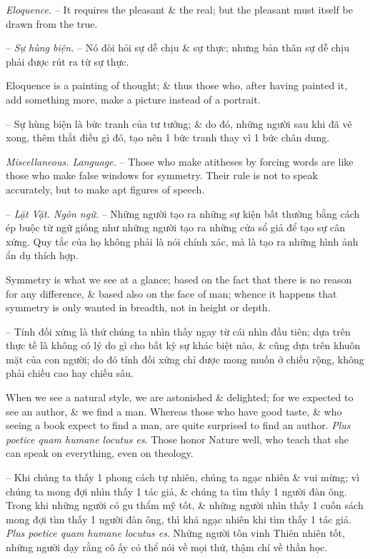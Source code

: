 \documentclass{article}
\begin{document}
\begin{enumerate}
\begin{itemize}
		 {\it Eloquence.} -- It requires the pleasant \& the real; but the pleasant must itself be drawn from the true.
		
		-- {\it Sự hùng biện.} -- Nó đòi hỏi sự dễ chịu \& sự thực; nhưng bản thân sự dễ chịu phải được rút ra từ sự thực.
		
		 Eloquence is a painting of thought; \& thus those who, after having painted it, add something more, make a picture instead of a portrait.
		
		-- Sự hùng biện là bức tranh của tư tưởng; \& do đó, những người sau khi đã vẽ xong, thêm thắt điều gì đó, tạo nên 1 bức tranh thay vì 1 bức chân dung.
		
		 {\it Miscellaneous. Language.} -- Those who make atitheses by forcing words are like those who make false windows for symmetry. Their rule is not to speak accurately, but to make apt figures of speech.
		
		-- {\it Lặt Vặt. Ngôn ngữ.} -- Những người tạo ra những sự kiện bất thường bằng cách ép buộc từ ngữ giống như những người tạo ra những cửa sổ giả để tạo sự cân xứng. Quy tắc của họ không phải là nói chính xác, mà là tạo ra những hình ảnh ẩn dụ thích hợp.
		
		 Symmetry is what we see at a glance; based on the fact that there is no reason for any difference, \& based also on the face of man; whence it happens that symmetry is only wanted in breadth, not in height or depth.
		
		-- Tính đối xứng là thứ chúng ta nhìn thấy ngay từ cái nhìn đầu tiên; dựa trên thực tế là không có lý do gì cho bất kỳ sự khác biệt nào, \& cũng dựa trên khuôn mặt của con người; do đó tính đối xứng chỉ được mong muốn ở chiều rộng, không phải chiều cao hay chiều sâu.
		
		 When we see a natural style, we are astonished \& delighted; for we expected to see an author, \& we find a man. Whereas those who have good taste, \& who seeing a book expect to find a man, are quite surprised to find an author. {\it Plus poetice quam humane locutus es}. Those honor Nature well, who teach that she can speak on everything, even on theology.
		
		-- Khi chúng ta thấy 1 phong cách tự nhiên, chúng ta ngạc nhiên \& vui mừng; vì chúng ta mong đợi nhìn thấy 1 tác giả, \& chúng ta tìm thấy 1 người đàn ông. Trong khi những người có gu thẩm mỹ tốt, \& những người nhìn thấy 1 cuốn sách mong đợi tìm thấy 1 người đàn ông, thì khá ngạc nhiên khi tìm thấy 1 tác giả. {\it Plus poetice quam humane locutus es}. Những người tôn vinh Thiên nhiên tốt, những người dạy rằng cô ấy có thể nói về mọi thứ, thậm chí về thần học.
				

\end{itemize}
\end{enumerate}
\end{document}
